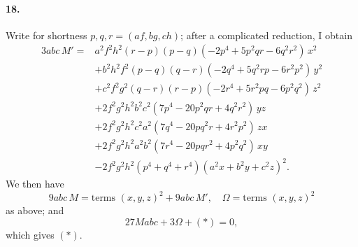 \documentclass[11pt,a4paper]{article}
\begin{document}
\paragraph{18.}
Write for shortness $p, q, r = (af, bg, ch)$; after a complicated reduction, I obtain
\[
\begin{aligned}
3 abc \, M' = {}& a^2 f^2 h^2 (r - p)(p - q)(- 2 p^4 + 5 p^2 qr - 6 q^2 r^2) \, x^2 \\
& + b^2 h^2 f^2 (p - q)(q - r)(- 2 q^4 + 5 q^2 rp - 6 r^2 p^2) \, y^2 \\
& + c^2 f^2 g^2 (q - r)(r - p)(- 2 r^4 + 5 r^2 pq - 6 p^2 q^2) \, z^2 \\
& + 2 f^2 g^2 h^2 b^2 c^2 (7 p^4 - 20 p^2 qr + 4 q^2 r^2) \, yz \\
& + 2 f^2 g^2 h^2 c^2 a^2 (7 q^4 - 20 pq^2 r + 4 r^2 p^2) \, zx \\
& + 2 f^2 g^2 h^2 a^2 b^2 (7 r^4 - 20 pqr^2 + 4 p^2 q^2) \, xy \\
& - 2 f^2 g^2 h^2 (p^4 + q^4 + r^4)(a^2 x + b^2 y + c^2 z)^2.
\end{aligned}
\]
We then have
\[
9 abc \, M = \text{terms } (x, y, z)^2 + 9 abc \, M',\quad
\Omega = \text{terms } (x, y, z)^2
\]
as above; and
\[
27 M abc + 3 \Omega + (*) = 0,
\]
which gives $(*)$.
\end{document}
